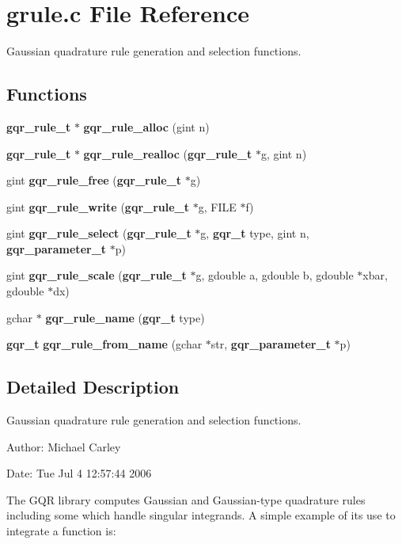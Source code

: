 \section{grule.c File Reference}
\label{grule_8c}
Gaussian quadrature rule generation and selection functions. 

\subsection*{Functions}
\begin{CompactItemize}
\item 
{\bf gqr\_\-rule\_\-t} $\ast$ {\bf gqr\_\-rule\_\-alloc} (gint n)
\item 
{\bf gqr\_\-rule\_\-t} $\ast$ {\bf gqr\_\-rule\_\-realloc} ({\bf gqr\_\-rule\_\-t} $\ast$g, gint n)
\item 
gint {\bf gqr\_\-rule\_\-free} ({\bf gqr\_\-rule\_\-t} $\ast$g)
\item 
gint {\bf gqr\_\-rule\_\-write} ({\bf gqr\_\-rule\_\-t} $\ast$g, FILE $\ast$f)
\item 
gint {\bf gqr\_\-rule\_\-select} ({\bf gqr\_\-rule\_\-t} $\ast$g, {\bf gqr\_\-t} type, gint n, {\bf gqr\_\-parameter\_\-t} $\ast$p)
\item 
gint {\bf gqr\_\-rule\_\-scale} ({\bf gqr\_\-rule\_\-t} $\ast$g, gdouble a, gdouble b, gdouble $\ast$xbar, gdouble $\ast$dx)
\item 
gchar $\ast$ {\bf gqr\_\-rule\_\-name} ({\bf gqr\_\-t} type)
\item 
{\bf gqr\_\-t} {\bf gqr\_\-rule\_\-from\_\-name} (gchar $\ast$str, {\bf gqr\_\-parameter\_\-t} $\ast$p)
\end{CompactItemize}


\subsection{Detailed Description}
Gaussian quadrature rule generation and selection functions. 

\begin{Desc}
\item[Author:]Michael Carley \end{Desc}
\begin{Desc}
\item[Date:]Tue Jul 4 12:57:44 2006\end{Desc}
The GQR library computes Gaussian and Gaussian-type quadrature rules including some which handle singular integrands. A simple example of its use to integrate a function is: 